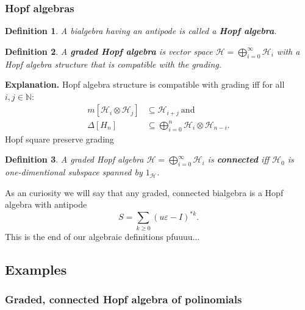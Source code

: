 \documentclass[a4paper]{article}
\newtheorem{definition}{Definition}
\begin{document}
\subsubsection{Hopf algebras}
\begin{definition}
A bialgebra having an antipode is called a \textbf{Hopf algebra}.
\end{definition}
\begin{definition}
A \textbf{graded Hopf algebra} is vector space 
$\mathcal{H} = \displaystyle\bigoplus^{\infty}_{i=0}\mathcal{H}_i$ with a Hopf algebra structure that is 
compatible with the grading.
\end{definition}
\textbf{Explanation. } Hopf algebra structure is compatible with grading iff for all $i, j \in \mathbb{N}$:
\begin{align*}
m[\mathcal{H}_i \otimes \mathcal{H}_j] &\subseteq \mathcal{H}_{i+j} \mathrm{\ and} \\
\Delta[H_n] &\subseteq \bigoplus^{n}_{i = 0} \mathcal{H}_i \otimes \mathcal{H}_{n-i}.
\end{align*}
Hopf square preserve grading
\begin{definition}
A graded Hopf algebra $\mathcal{H} = \displaystyle\bigoplus^{\infty}_{i=0}\mathcal{H}_i$ is 
\textbf{connected} iff $\mathcal{H}_0$ is one-dimentional subspace spanned by $1_\mathcal{H}$.
\end{definition}
As an curiosity we will say that any graded, connected bialgebra is a Hopf algebra with antipode
\begin{equation*}
S = \sum_{k \geq 0} (u\varepsilon - I)^{*k}.
\end{equation*}
This is the end of our algebraic definitions pfuuuu...
\subsection{Examples}
\subsubsection{Graded, connected Hopf algebra of polinomials}
\end{document}
